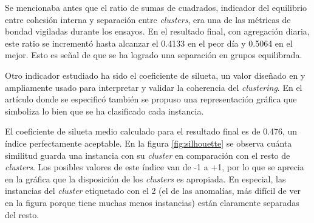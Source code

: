 Se mencionaba antes que el ratio de sumas de cuadrados, indicador del equilibrio entre cohesión interna y separación entre \emph{clusters}, era una de las métricas de bondad vigiladas durante los ensayos.
En el resultado final, con agregación diaria, este ratio se incrementó hasta alcanzar el 0.4133 en el peor día y 0.5064 en el mejor.
Esto es señal de que se ha logrado una separación en grupos equilibrada.

Otro indicador estudiado ha sido el coeficiente de silueta, un valor diseñado en \cite{Rousseeuw_1987} y ampliamente usado para interpretar y validar la coherencia del \emph{clustering}.
En el artículo donde se especificó también se propuso una representación gráfica que simboliza lo bien que se ha clasificado cada instancia.

El coeficiente de silueta medio calculado para el resultado final es de 0.476, un índice perfectamente aceptable.
En la figura \ref{fig:silhouette} se observa cuánta similitud guarda una instancia con su \emph{cluster} en comparación con el resto de \emph{clusters}.
Los posibles valores de este índice van de -1 a +1, por lo que se aprecia en la gráfica que la disposición de los \emph{clusters} es apropiada.
En especial, las instancias del \emph{cluster} etiquetado con el 2 (el de las anomalías, más difícil de ver en la figura porque tiene muchas menos instancias) están claramente separadas del resto.

